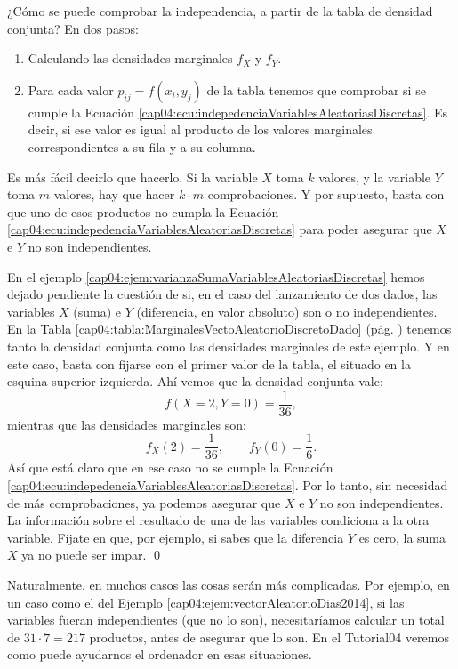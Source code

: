 ¿Cómo se puede comprobar la independencia, a partir de la tabla de densidad conjunta? En dos pasos:
\begin{enumerate}
  \item Calculando las densidades marginales $f_X$ y $f_Y$.
  \item Para cada valor $p_{ij}=f(x_i,y_j)$ de la tabla tenemos que comprobar si se cumple la Ecuación \ref{cap04:ecu:indepedenciaVariablesAleatoriasDiscretas}. Es decir, si ese valor es igual al producto de los valores marginales correspondientes a su fila y a su columna.
\end{enumerate}
Es más fácil decirlo que hacerlo. Si la variable $X$ toma $k$ valores, y la variable $Y$ toma $m$ valores, hay que hacer $k\cdot m$ comprobaciones. Y por supuesto, basta con que uno de esos productos no cumpla la Ecuación \ref{cap04:ecu:indepedenciaVariablesAleatoriasDiscretas} para poder asegurar que $X$ e $Y$ no son independientes.


\begin{ejemplo}
\label{cap04:ejem:IndependenciaVariablesAleatoriasDiscretas}
En el ejemplo \ref{cap04:ejem:varianzaSumaVariablesAleatoriasDiscretas} hemos dejado pendiente la cuestión de si, en el caso del lanzamiento de dos dados, las variables $X$ (suma) e $Y$ (diferencia, en valor absoluto) son o no independientes. En la Tabla \ref{cap04:tabla:MarginalesVectoAleatorioDiscretoDado} (pág. \pageref{cap04:tabla:MarginalesVectoAleatorioDiscretoDado}) tenemos tanto la densidad conjunta como las densidades marginales de este ejemplo. Y en este caso, basta con fijarse con el primer valor de la tabla, el situado en la esquina superior izquierda. Ahí vemos que la densidad conjunta vale:
\[f(X=2, Y=0)=\dfrac{1}{36},\]
mientras que las densidades marginales son:
\[
f_X(2)=\dfrac{1}{36},\qquad f_Y(0)=\dfrac{1}{6}.
\]
Así que está claro que en ese caso no se cumple la Ecuación \ref{cap04:ecu:indepedenciaVariablesAleatoriasDiscretas}. Por lo tanto, sin necesidad de más comprobaciones, ya podemos asegurar que $X$ e $Y$ no son independientes. La información sobre el resultado de una de las variables condiciona a la otra variable. Fíjate en que, por ejemplo, si sabes que la diferencia $Y$ es cero, la suma $X$ ya no puede ser impar.
\qed
\end{ejemplo}
Naturalmente, en muchos casos las cosas serán más complicadas. Por ejemplo, en un caso como el del Ejemplo \ref{cap04:ejem:vectorAleatorioDias2014}, si las variables fueran independientes (que no lo son), necesitaríamos calcular un total de $31\cdot 7=217$ productos, antes de asegurar que lo son. En el Tutorial04 veremos como puede ayudarnos el ordenador en esas situaciones.

